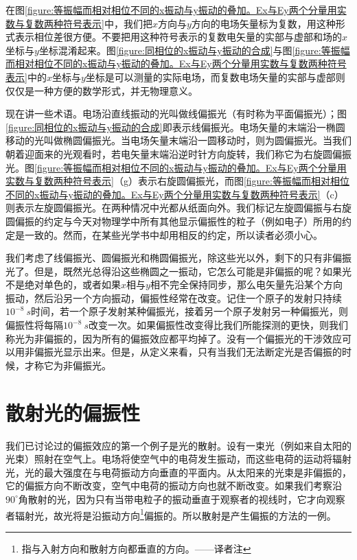 在图\ref{figure:等振幅而相对相位不同的x振动与y振动的叠加。Ex与Ey两个分量用实数与复数两种符号表示}中，我们把$x$方向与$y$方向的电场矢量标为复数，用这种形式表示相位差很方便。不要把用这种符号表示的复数电矢量的实部与虚部和场的$x$坐标与$y$坐标混淆起来。图\ref{figure:同相位的x振动与y振动的合成}与图\ref{figure:等振幅而相对相位不同的x振动与y振动的叠加。Ex与Ey两个分量用实数与复数两种符号表示}中的$x$坐标与$y$坐标是可以测量的实际电场，而复数电场矢量的实部与虚部则仅仅是一种方便的数学形式，并无物理意义。

现在讲一些术语。电场沿直线振动的光叫做线偏振光（有时称为平面偏振光）；图\ref{figure:同相位的x振动与y振动的合成}即表示线偏振光。电场矢量的末端沿一椭圆移动的光叫做椭圆偏振光。当电场矢量末端沿一圆移动时，则为圆偏振光。当我们朝着迎面来的光观看时，若电矢量末端沿逆时针方向旋转，我们称它为右旋圆偏振光。图\ref{figure:等振幅而相对相位不同的x振动与y振动的叠加。Ex与Ey两个分量用实数与复数两种符号表示}（g）表示右旋圆偏振光，而图\ref{figure:等振幅而相对相位不同的x振动与y振动的叠加。Ex与Ey两个分量用实数与复数两种符号表示}（c）则表示左旋圆偏振光。在两种情况中光都从纸面向外。我们标记左旋圆偏振与右旋圆偏振的约定与今天对物理学中所有其他显示偏振性的粒子（例如电子）所用的约定是一致的。然而，在某些光学书中却用相反的约定，所以读者必须小心。

我们考虑了线偏振光、圆偏振光和椭圆偏振光，除这些光以外，剩下的只有非偏振光了。但是，既然光总得沿这些椭圆之一振动，它怎么可能是非偏振的呢？如果光不是绝对单色的，或者如果$x$相与$y$相不完全保持同步，那么电矢量先沿某个方向振动，然后沿另一个方向振动，偏振性经常在改变。记住一个原子的发射只持续$10^{-8}~s$时间，若一个原子发射某种偏振光，接着另一个原子发射另一种偏振光，则偏振性将每隔$10^{-8}~s$改变一次。如果偏振性改变得比我们所能探测的更快，则我们称光为非偏振的，因为所有的偏振效应都平均掉了。没有一个偏振光的干涉效应可以用非偏振光显示出来。但是，从定义来看，只有当我们无法断定光是否偏振的时候，才称它为非偏振光。

\section{散射光的偏振性}

我们已讨论过的偏振效应的第一个例子是光的散射。设有一束光（例如来自太阳的光束）照射在空气上。电场将使空气中的电荷发生振动，而这些电荷的运动将辐射光，光的最大强度在与电荷振动方向垂直的平面内。从太阳来的光束是非偏振的，它的偏振方向不断改变，空气中电荷的振动方向也就不断改变。如果我们考察沿$90^\circ$角散射的光，因为只有当带电粒子的振动垂直于观察者的视线时，它才向观察者辐射光，故光将是沿振动方向\footnote{指与入射方向和散射方向都垂直的方向。——译者注}偏振的。所以散射是产生偏振的方法的一例。

